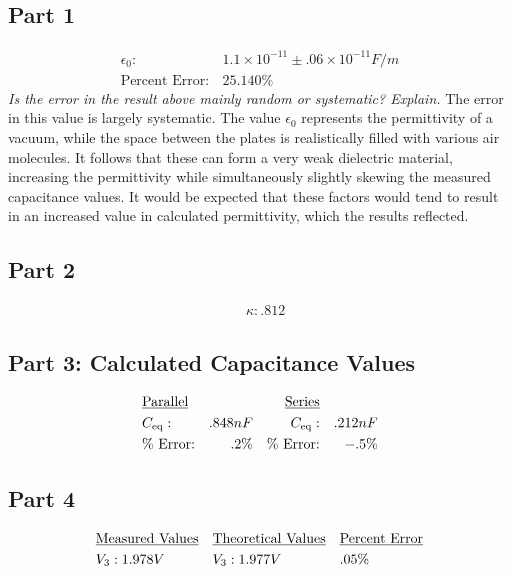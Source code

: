 \documentclass[twocolumn,english]{IEEEtran}
\theoremstyle{plain}
\theoremstyle{plain}
\begin{document}
  \subsection*{\textbf{Part 1}}
  \begin{align*}
  \epsilon_0:& \,1.1 \times 10^{-11} \pm .06 \times 10^{-11} F/m \\
  \text{Percent Error:}& \,25.140\%
  \end{align*}
  \textit{Is the error in the result above mainly random or systematic? Explain.}
  The error in this value is largely systematic. The value $\epsilon_0$ represents the permittivity of a vacuum, while the space between the plates is realistically filled with various air molecules. It follows that these can form a very weak dielectric material, increasing the permittivity while simultaneously slightly skewing the measured capacitance values. It would be expected that these factors would tend to result in an increased value in calculated permittivity, which the results reflected.

  \subsection*{\textbf{Part 2}}
  \begin{align*}
  &\kappa: .812
  \end{align*}

  \subsection*{\textbf{Part 3: Calculated Capacitance Values}}
  \begin{align*}
  &\text{\underline{Parallel}}	&				&	&\text{\underline{Series}}&		& 			      &			\\
  &C_{\text{eq}}:	&\text .848 nF			&	&C_{\text{eq}}:&	&.212 nF&			\\
  &\text{\% Error:}	&.2\%				&	&\text{\% Error:}&	&-.5\%&			\\
  \end{align*}

  \subsection*{\textbf{Part 4}}
  \begin{align*}
  &\text{\underline{Measured Values}} & &\text{\underline{Theoretical Values}} & 	&\text{\underline{Percent Error}}\\
  &V_3: 1.978 V 	& 		&V_3: 1.977 V & 		& .05\%
  \end{align*}




\end{document}
